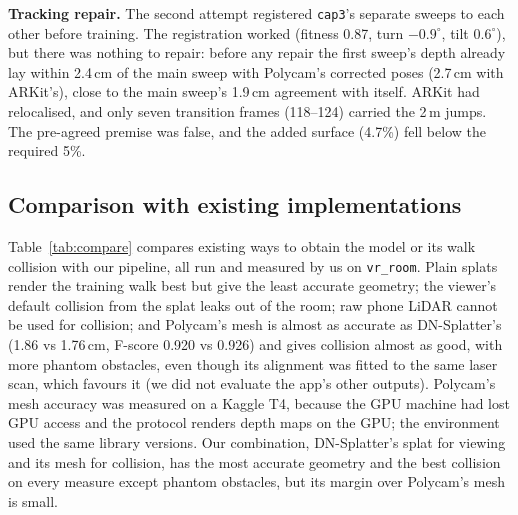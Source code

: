 \textbf{Tracking repair.} The second attempt registered \texttt{cap3}'s separate sweeps to each other before training. The registration worked (fitness 0.87, turn $-0.9^\circ$, tilt $0.6^\circ$), but there was nothing to repair: before any repair the first sweep's depth already lay within 2.4\,cm of the main sweep with Polycam's corrected poses (2.7\,cm with ARKit's), close to the main sweep's 1.9\,cm agreement with itself. ARKit had relocalised, and only seven transition frames (118--124) carried the 2\,m jumps. The pre-agreed premise was false, and the added surface (4.7\%) fell below the required 5\%.

\subsection{Comparison with existing implementations}
Table~\ref{tab:compare} compares existing ways to obtain the model or its walk collision with our pipeline, all run and measured by us on \texttt{vr\_room}. Plain splats render the training walk best but give the least accurate geometry; the viewer's default collision from the splat leaks out of the room; raw phone LiDAR cannot be used for collision; and Polycam's mesh is almost as accurate as DN-Splatter's (1.86 vs 1.76\,cm, F-score 0.920 vs 0.926) and gives collision almost as good, with more phantom obstacles, even though its alignment was fitted to the same laser scan, which favours it (we did not evaluate the app's other outputs). Polycam's mesh accuracy was measured on a Kaggle T4, because the GPU machine had lost GPU access and the protocol renders depth maps on the GPU; the environment used the same library versions. Our combination, DN-Splatter's splat for viewing and its mesh for collision, has the most accurate geometry and the best collision on every measure except phantom obstacles, but its margin over Polycam's mesh is small.

